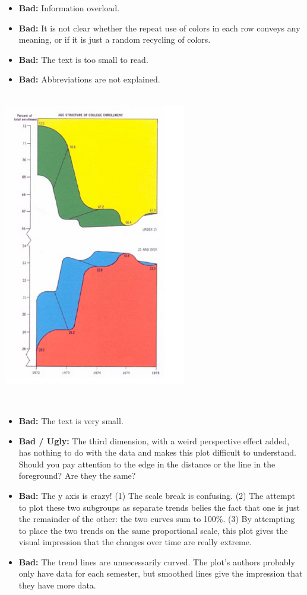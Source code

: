 \documentclass[
]{book}
\providecommand{\tightlist}{%
  \setlength{\itemsep}{0pt}\setlength{\parskip}{0pt}}
\begin{document}
\begin{itemize}
\tightlist
\item
  \textbf{Bad:} Information overload.
\item
  \textbf{Bad:} It is not clear whether the repeat use of colors in each row conveys any meaning, or if it is just a random recycling of colors.
\item
  \textbf{Bad:} The text is too small to read.\\
\item
  \textbf{Bad:} Abbreviations are not explained.
\end{itemize}

~\\

\includegraphics[width=0.6\textwidth,height=\textheight]{img/vis8.jpeg}

~

\begin{itemize}
\tightlist
\item
  \textbf{Bad:} The text is very small.
\item
  \textbf{Bad / Ugly:} The third dimension, with a weird perspective effect added, has nothing to do with the data and makes this plot difficult to understand. Should you pay attention to the edge in the distance or the line in the foreground? Are they the same?\\
\item
  \textbf{Bad:} The y axis is crazy! (1) The scale break is confusing. (2) The attempt to plot these two subgroups as separate trends belies the fact that one is just the remainder of the other: the two curves sum to 100\%. (3) By attempting to place the two trends on the same proportional scale, this plot gives the visual impression that the changes over time are really extreme.
\item
  \textbf{Bad:} The trend lines are unnecessarily curved. The plot's authors probably only have data for each semester, but smoothed lines give the impression that they have more data.
\end{itemize}
\end{document}
